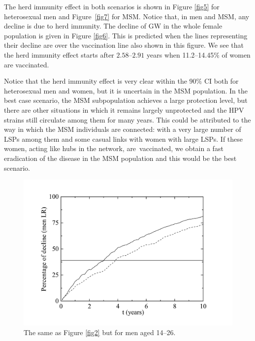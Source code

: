 The herd immunity effect in both scenarios is shown in Figure \ref{fig5} for heterosexual men and  Figure~\ref{fig7} for MSM.  Notice that, in men and MSM, any decline is due to herd immunity. The decline of GW in the whole female population is given in Figure \ref{fig6}. This is predicted when the lines representing their decline are over the vaccination line also shown in this figure. We see that the herd immunity effect starts after $2.58$--$2.91$ years when 11.2--14.45$\%$ of women are vaccinated.

Notice that the herd immunity effect is very clear within the $90\%$ CI both for heterosexual men and women, but it is uncertain in the MSM population. In the best case scenario, the MSM subpopulation achieves a large protection level, but there are other situations in which it remains largely unprotected and the HPV strains still circulate among them for many years. This could be attributed to the way in which the MSM individuals are connected: with a very large number of LSPs among them and some casual links with women with large LSPs. If these women, acting like hubs in the network, are~vaccinated, we obtain a fast eradication of the disease in the MSM population and this would be the best scenario.

\begin{figure}[H]
	\centering
	\includegraphics[scale=0.4]{DeclinemenLR.pdf}
	\vspace{-12pt}
	\caption{The same as Figure \protect\ref{fig2} but for men aged 14--26.}
	\label{fig3}
\end{figure}
\vspace{-30pt}

